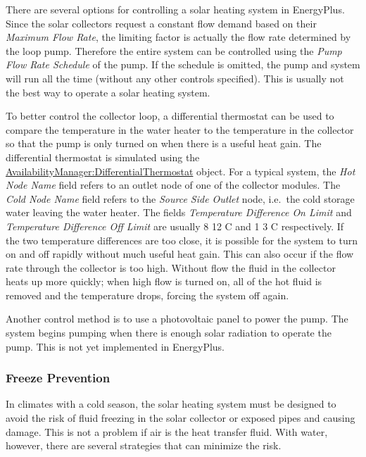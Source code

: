 There are several options for controlling a solar heating system in EnergyPlus. Since the solar collectors request a constant flow demand based on their \emph{Maximum Flow Rate}, the limiting factor is actually the flow rate determined by the loop pump. Therefore the entire system can be controlled using the \emph{Pump Flow Rate Schedule} of the pump. If the schedule is omitted, the pump and system will run all the time (without any other controls specified). This is usually not the best way to operate a solar heating system.

To better control the collector loop, a differential thermostat can be used to compare the temperature in the water heater to the temperature in the collector so that the pump is only turned on when there is a useful heat gain. The differential thermostat is simulated using the \hyperref[availabilitymanagerdifferentialthermostat]{AvailabilityManager:DifferentialThermostat} object. For a typical system, the \emph{Hot Node Name} field refers to an outlet node of one of the collector modules. The \emph{Cold Node Name} field refers to the \emph{Source Side Outlet} node, i.e.~the cold storage water leaving the water heater. The fields \emph{Temperature Difference On Limit} and \emph{Temperature Difference Off Limit} are usually 8 12 C and 1 3 C respectively. If the two temperature differences are too close, it is possible for the system to turn on and off rapidly without much useful heat gain. This can also occur if the flow rate through the collector is too high. Without flow the fluid in the collector heats up more quickly; when high flow is turned on, all of the hot fluid is removed and the temperature drops, forcing the system off again.

Another control method is to use a photovoltaic panel to power the pump. The system begins pumping when there is enough solar radiation to operate the pump. This is not yet implemented in EnergyPlus.

\subsubsection{Freeze Prevention}\label{freeze-prevention}

In climates with a cold season, the solar heating system must be designed to avoid the risk of fluid freezing in the solar collector or exposed pipes and causing damage. This is not a problem if air is the heat transfer fluid. With water, however, there are several strategies that can minimize the risk.

